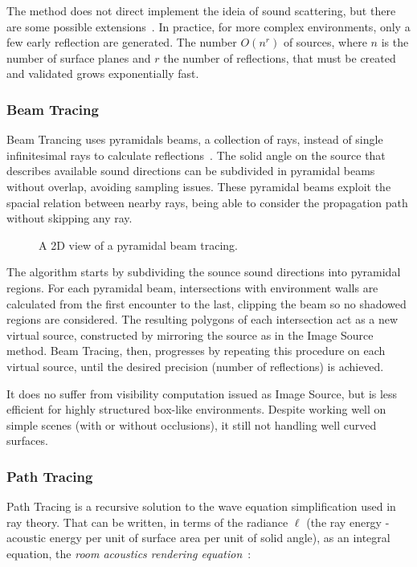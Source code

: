 The method does not direct implement the ideia of sound scattering, but there
are some possible extensions~\cite{chandak2011fast}. In practice, for more
complex environments, only a few early reflection are generated. The number
$O(n^r)$ of sources, where $n$ is the number of surface planes and $r$ the
number of reflections, that must be created and validated grows exponentially
fast.

\subsubsection{Beam Tracing}

Beam Trancing uses pyramidals beams, a collection of rays, instead of single
infinitesimal rays to calculate reflections~\cite{funkhouser2003survey}. The
solid angle on the source that describes available sound directions can be
subdivided in pyramidal beams without overlap, avoiding sampling issues. These
pyramidal beams exploit the spacial relation between nearby rays, being able to
consider the propagation path without skipping any ray.

\begin{figure}[h]
	\centering
	
	\caption{A 2D view of a pyramidal beam tracing.}
	\label{fig:beamtrace}
\end{figure}

The algorithm starts by subdividing the sounce sound directions into pyramidal
regions. For each pyramidal beam, intersections with environment walls are
calculated from the first encounter to the last, clipping the beam so no
shadowed regions are considered. The resulting polygons of each intersection act
as a new virtual source, constructed by mirroring the source as in the Image
Source method. Beam Tracing, then, progresses by repeating this procedure on
each virtual source, until the desired precision (number of reflections) is
achieved.

It does no suffer from visibility computation issued as Image Source, but is
less efficient for highly structured box-like environments. Despite working well
on simple scenes (with or without occlusions), it still not handling well
curved surfaces.


\subsubsection{Path Tracing}

Path Tracing is a recursive solution to the wave equation simplification used in
ray theory. That can be written, in terms of the radiance $\ell$ (the ray
energy - acoustic energy per unit of surface area per unit of solid angle), as an
integral equation, the \textit{room acoustics rendering
equation}~\cite{siltanen2007room}:

